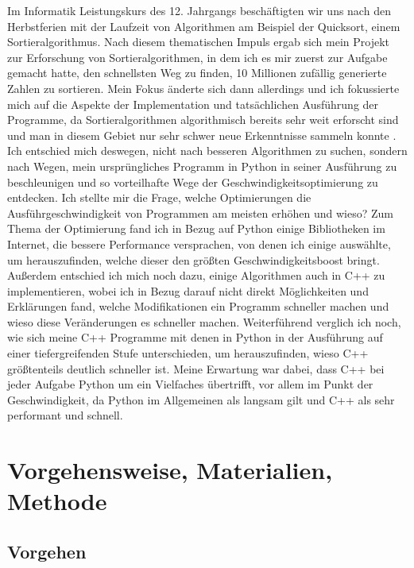 \documentclass[10pt,a4paper]{article}
\begin{document}
Im Informatik Leistungskurs des 12. Jahrgangs beschäftigten wir uns nach den Herbstferien mit
der Laufzeit von Algorithmen am Beispiel der Quicksort, einem Sortieralgorithmus.
Nach diesem thematischen Impuls ergab sich mein Projekt zur Erforschung von Sortieralgorithmen,
in dem ich es mir zuerst zur Aufgabe gemacht hatte, den schnellsten Weg zu finden, 10 Millionen zufällig
generierte Zahlen zu sortieren. Mein Fokus änderte sich dann allerdings und ich fokussierte mich
auf die Aspekte der Implementation und tatsächlichen Ausführung der Programme, da 
Sortieralgorithmen algorithmisch bereits sehr weit erforscht sind und man in diesem Gebiet nur
sehr schwer neue Erkenntnisse sammeln konnte \cite{sortieralgorithmenwikipedia}.
Ich entschied mich deswegen, nicht nach besseren Algorithmen zu suchen, sondern nach Wegen, 
mein ursprüngliches Programm in Python in seiner Ausführung zu beschleunigen und so vorteilhafte
Wege der Geschwindigkeitsoptimierung zu entdecken.
Ich stellte mir die Frage, welche Optimierungen die Ausführgeschwindigkeit von Programmen
am meisten erhöhen und wieso?
Zum Thema der Optimierung fand ich in Bezug auf Python einige Bibliotheken im Internet, die
bessere Performance versprachen, von denen ich einige auswählte, um herauszufinden,
welche dieser den größten Geschwindigkeitsboost bringt.
Außerdem entschied ich mich noch dazu, einige Algorithmen auch in C++ zu implementieren, wobei ich in Bezug
darauf nicht direkt Möglichkeiten und Erklärungen fand, welche Modifikationen ein Programm schneller machen und
wieso diese Veränderungen es schneller machen.
Weiterführend verglich ich noch, wie sich meine C++ Programme mit denen in Python in der Ausführung auf einer
tiefergreifenden Stufe unterschieden, um herauszufinden, wieso C++ größtenteils deutlich schneller ist.
Meine Erwartung war dabei, dass C++ bei jeder Aufgabe Python um ein Vielfaches übertrifft, vor allem im Punkt der Geschwindigkeit,
da Python im Allgemeinen als langsam gilt und C++ als sehr performant und schnell.

\clearpage

\section{Vorgehensweise, Materialien, Methode}

\subsection{Vorgehen}
\end{document}
